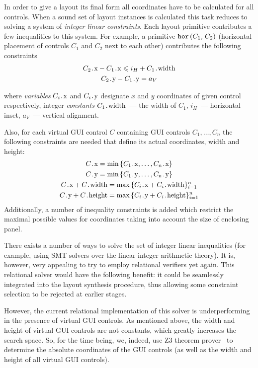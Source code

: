 
In order to give a layout its final form all coordinates have to be calculated for all controls.
When a sound set of layout instances is calculated this task reduces to solving a system of \emph{integer linear constraints}.
Each layout primitive contributes a few inequalities to this system.
For example, a primitive $\mbox{\texttt{\textbf{hor}}}\,(C_1,\,C_2)$ (horizontal placement of controls $C_1$ and $C_2$ next to each other) contributes the following constraints
\begin{gather*}
  C_2\prg{.x} - C_1\prg{.x} \leq i_H + C_1\prg{.width}\\
  C_2\prg{.y} - C_1\prg{.y} = a_V
\end{gather*}

\noindent where \emph{variables} $C_i\prg{.x}$ and $C_i\prg{.y}$ designate $x$ and $y$ coordinates of given control respectively, integer
\emph{constants} $C_1\prg{.width}$~--- the width of $C_1$, $i_H$~--- horizontal inset, $a_V$~--- vertical alignment.

Also, for each virtual GUI control $C$ containing GUI controls $C_1, \ldots, C_n$ the following constraints are needed that define
its actual coordinates, width and height:
  \begin{gather*}
    C\prg{.x} = \min\,\{C_1\prg{.x}, \ldots, C_n\prg{.x}\}\\
    C\prg{.y} = \min\,\{C_1\prg{.y}, \ldots, C_n\prg{.y}\}\\
    C\prg{.x} + C\prg{.width} = \max\,\{C_i\prg{.x} + C_i\prg{.width}\}_{i=1}^n\\
    C\prg{.y} + C\prg{.height} = \max\,\{C_i\prg{.y} + C_i\prg{.height}\}_{i=1}^n\\
  \end{gather*}
Additionally, a number of inequality constraints is added which restrict the maximal possible values for
coordinates taking into account the size of enclosing panel.

There exists a number of ways to solve the set of integer linear inequalities (for example, using SMT solvers over the linear
integer arithmetic theory). It is, however, very appealing to try to employ relational verifiers yet again.
This relational solver would have the following benefit: it could be seamlessly integrated into the layout synthesis procedure, thus allowing some
constraint selection to be rejected at earlier stages.

However, the current relational implementation of this solver is underperforming in the presence of virtual GUI controls.
As mentioned above, the width and height of virtual GUI controls are not constants, which greatly increases the
search space. So, for the time being, we, indeed, use \textsc{Z3} theorem prover~\cite{Zthree} to determine the
absolute coordinates of the GUI controls (as well as the width and height of all virtual GUI controls).

